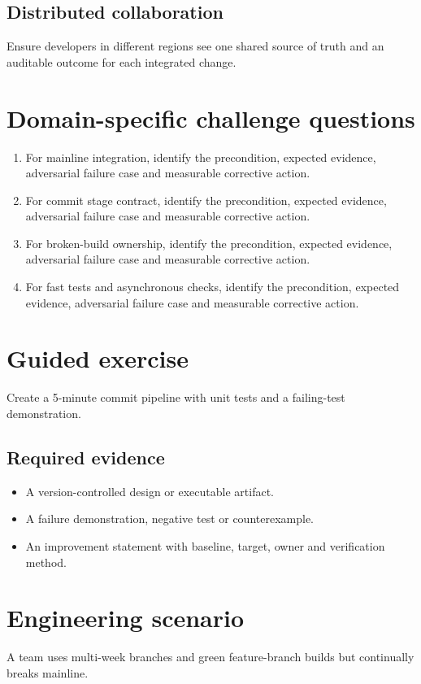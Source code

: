 \documentclass[10pt,letterpaper]{article}
\begin{document}
\subsection{Distributed collaboration}
Ensure developers in different regions see one shared source of truth and an auditable outcome for each integrated change.

\section{Domain-specific challenge questions}
\begin{enumerate}
\item For mainline integration, identify the precondition, expected evidence, adversarial failure case and measurable corrective action.
\item For commit stage contract, identify the precondition, expected evidence, adversarial failure case and measurable corrective action.
\item For broken-build ownership, identify the precondition, expected evidence, adversarial failure case and measurable corrective action.
\item For fast tests and asynchronous checks, identify the precondition, expected evidence, adversarial failure case and measurable corrective action.
\end{enumerate}
\section{Guided exercise}
Create a 5-minute commit pipeline with unit tests and a failing-test demonstration.

\subsection{Required evidence}
\begin{itemize}
\item A version-controlled design or executable artifact.
\item A failure demonstration, negative test or counterexample.
\item An improvement statement with baseline, target, owner and verification method.
\end{itemize}


\section{Engineering scenario}
A team uses multi-week branches and green feature-branch builds but continually breaks mainline.
\end{document}
